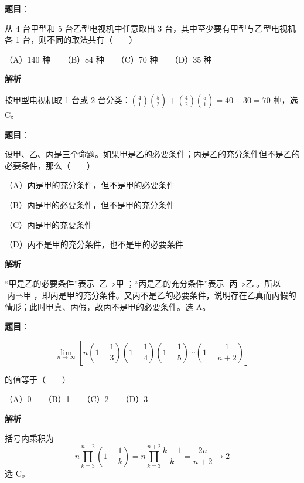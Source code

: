 \begin{answer}

\textbf{题目}：

从 4 台甲型和 5 台乙型电视机中任意取出 3 台，其中至少要有甲型与乙型电视机各 1 台，则不同的取法共有\mbox{（　　）}

（A）140 种　　（B）84 种　　（C）70 种　　（D）35 种

\textbf{解析}

按甲型电视机取 1 台或 2 台分类：$\binom41\binom52+\binom42\binom51=40+30=70$ 种，选 C。


\end{answer}
\begin{answer}

\textbf{题目}：

设甲、乙、丙是三个命题。如果甲是乙的必要条件；丙是乙的充分条件但不是乙的必要条件，那么\mbox{（　　）}

（A）丙是甲的充分条件，但不是甲的必要条件

（B）丙是甲的必要条件，但不是甲的充分条件

（C）丙是甲的充要条件

（D）丙不是甲的充分条件，也不是甲的必要条件

\textbf{解析}

“甲是乙的必要条件”表示 $\text{乙}\Rightarrow\text{甲}$；“丙是乙的充分条件”表示 $\text{丙}\Rightarrow\text{乙}$。所以 $\text{丙}\Rightarrow\text{甲}$，即丙是甲的充分条件。又丙不是乙的必要条件，说明存在乙真而丙假的情形；此时甲真、丙假，故丙不是甲的必要条件。选 A。


\end{answer}
\begin{answer}

\textbf{题目}：

\nopagebreak[4]
\[
\lim_{n\to\infty}\left[n\left(1-\frac13\right)\left(1-\frac14\right)\left(1-\frac15\right)\cdots\left(1-\frac1{n+2}\right)\right]
\]

的值等于\mbox{（　　）}

（A）0　　（B）1　　（C）2　　（D）3

\textbf{解析}

括号内乘积为
\nopagebreak[4]
\[
n\prod_{k=3}^{n+2}\left(1-\frac1k\right)
=n\prod_{k=3}^{n+2}\frac{k-1}{k}
=\frac{2n}{n+2}\longrightarrow2
\]
选 C。


\end{answer}
